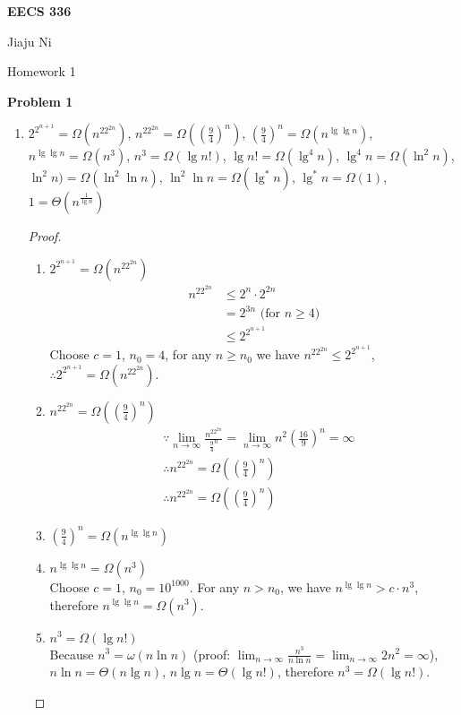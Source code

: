 \documentclass[12pt,letterpaper]{article}
\def\pp{\par\noindent}
\newcommand{\problem}[1]{ \bigskip \pp \textbf{Problem #1}\par}
\begin{document}
\centerline{\bf EECS 336}

\medskip
\centerline{Jiaju Ni}
\centerline{Homework 1}
\bigskip


\problem{1}
\begin{enumerate}
\item
\begin{solution}
$2^{2^{n+1}}=\Omega(n^22^{2n})$, $n^22^{2n}=\Omega((\frac{9}{4})^n)$, $(\frac{9}{4})^n=\Omega(n^{\lg\lg n})$, $n^{\lg\lg n}=\Omega(n^3)$, $n^3=\Omega(\lg n!)$, $\lg n!=\Omega(\lg^4n)$, $\lg^4n=\Omega(\ln^2n)$, $\ln^2{n})=\Omega(\ln^2\ln{n})$, $\ln^2\ln{n}=\Omega(\lg^*n)$, $\lg^*n=\Omega(1)$, $1=\Theta(n^{\frac{1}{\lg{n}}})$
\end{solution}
\begin{proof}
\begin{enumerate}
\item $2^{2^{n+1}}=\Omega(n^22^{2n})$\\
\begin{align*}
n^22^{2n} &\leq 2^n\cdot 2^{2n}\\
&=2^{3n} \text{ (for $n \geq 4$)}\\
&\leq 2^{2^{n+1}}
\end{align*}
Choose $c=1$, $n_0 = 4$, for any $n \geq n_0$ we have $n^22^{2n} \leq 2^{2^{n+1}}$,
$\therefore 2^{2^{n+1}}=\Omega(n^22^{2n})$.
\item $n^22^{2n}=\Omega((\frac{9}{4})^n)$
\begin{align*}
&\because \lim_{n\to\infty}\frac{n^22^{2n}}{\frac{9}{4}^n}
= \lim_{n\to\infty}n^2(\frac{16}{9})^n
= \infty\\
&\therefore n^22^{2n}=\Omega((\frac{9}{4})^n)\\
&\therefore n^22^{2n}=\Omega((\frac{9}{4})^n)
\end{align*}
\item $(\frac{9}{4})^n=\Omega(n^{\lg\lg n})$\\
\item $n^{\lg\lg n}=\Omega(n^3)$\\
Choose $c=1$, $n_0=10^{1000}$. For any $n>n_0$, we have $n^{\lg\lg n}>c\cdot n^3$, therefore $n^{\lg\lg n}=\Omega(n^3)$.
\item $n^3=\Omega(\lg n!)$\\
Because $n^3=\omega(n\ln n)$ (proof: $\lim_{n\to\infty}\frac{n^3}{n\ln n} = \lim_{n\to\infty} {2n^2} = \infty$), $n\ln n=\Theta(n\lg n)$, $n\lg n=\Theta(\lg n!)$, therefore $n^3=\Omega(\lg n!)$.

\end{enumerate}
\end{proof}
\end{enumerate}
\end{document}
